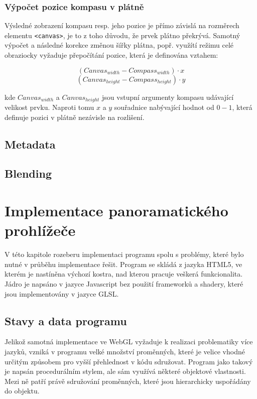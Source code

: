 \subsection{Výpočet pozice kompasu v plátně}
Výsledné zobrazení kompasu resp. jeho pozice je přímo závislá na rozměrech elementu \texttt{<canvas>}, je to z toho důvodu, že prvek plátno překrývá. Samotný výpočet a následné korekce změnou šířky plátna, popř. využítí režimu celé obraziocky vyžaduje přepočítání pozice, která je definována vztahem:

$$ \left( Canvas_{width} - Compass_{width}\right) \cdot x  $$
$$ \left( Canvas_{height} - Compass_{height}\right) \cdot y  $$

kde $Canvas_{width}$ a $Canvas_{height}$ jsou vstupní argumenty kompasu udávající velikost prvku. Naproti tomu  $x$ a $y$ souřadnice nabývající hodnot od $0-1$, která definuje pozici v plátně nezávisle na rozlišení.

\section{Metadata}
\section{Blending}

\chapter{Implementace panoramatického prohlížeče}
\label{chapter:4}
V této kapitole rozeberu implementaci programu  spolu s  problémy, které bylo nutné v průběhu implementace řešit. Program se skládá z jazyka HTML5, ve kterém je nastíněna výchozí kostra, nad kterou pracuje veškerá funkcionalita. Jádro je napsáno v jazyce Javascript bez použití frameworků  a  shadery, které jsou implementovány v jazyce GLSL. 


\section{Stavy a data programu}
Jelikož samotná implementace ve WebGL vyžaduje k realizaci problematiky více jazyků, vzniká v programu velké množství proměnných, které je velice vhodné určitým způsobem pro vyšší přehlednost v kódu sdružovat. Program jako takový je napsán procedurálním stylem, ale sám využívá některé objektové vlastnosti. Mezi ně patří právě sdružování proměnných, které jsou hierarchicky uspořádány do objektu.

